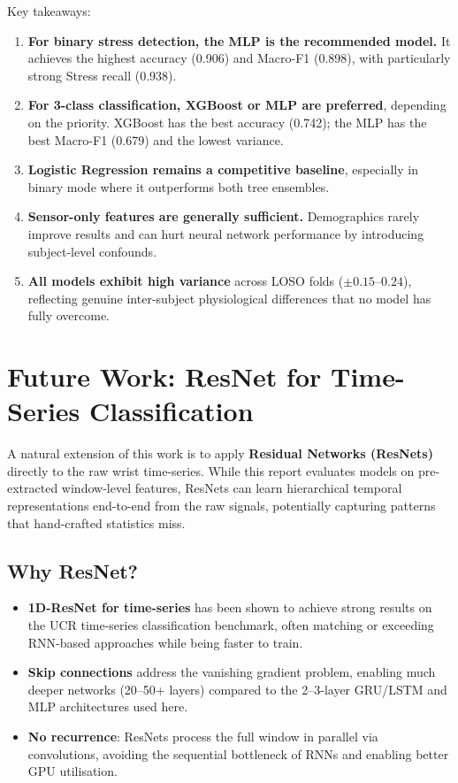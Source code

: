 \documentclass[11pt]{article}
\begin{document}
\noindent Key takeaways:

\begin{enumerate}
    \item \textbf{For binary stress detection, the MLP is the recommended model.}
    It achieves the highest accuracy (0.906) and Macro-F1 (0.898), with particularly strong Stress recall (0.938).

    \item \textbf{For 3-class classification, XGBoost or MLP are preferred}, depending on the priority.
    XGBoost has the best accuracy (0.742); the MLP has the best Macro-F1 (0.679) and the lowest variance.

    \item \textbf{Logistic Regression remains a competitive baseline}, especially in binary mode where it outperforms both tree ensembles.

    \item \textbf{Sensor-only features are generally sufficient.}
    Demographics rarely improve results and can hurt neural network performance by introducing subject-level confounds.

    \item \textbf{All models exhibit high variance} across LOSO folds ($\pm 0.15$--$0.24$), reflecting genuine inter-subject physiological differences that no model has fully overcome.
\end{enumerate}


\section{Future Work: ResNet for Time-Series Classification}
\label{sec:future-resnet}

A natural extension of this work is to apply \textbf{Residual Networks (ResNets)} directly to the raw wrist time-series.
While this report evaluates models on pre-extracted window-level features, ResNets can learn hierarchical temporal representations end-to-end from the raw signals, potentially capturing patterns that hand-crafted statistics miss.

\subsection{Why ResNet?}
\begin{itemize}
    \item \textbf{1D-ResNet for time-series} has been shown to achieve strong results on the UCR time-series classification benchmark, often matching or exceeding RNN-based approaches while being faster to train.
    \item \textbf{Skip connections} address the vanishing gradient problem, enabling much deeper networks (20--50+ layers) compared to the 2--3-layer GRU/LSTM and MLP architectures used here.
    \item \textbf{No recurrence}: ResNets process the full window in parallel via convolutions, avoiding the sequential bottleneck of RNNs and enabling better GPU utilisation.
\end{itemize}
\end{document}

